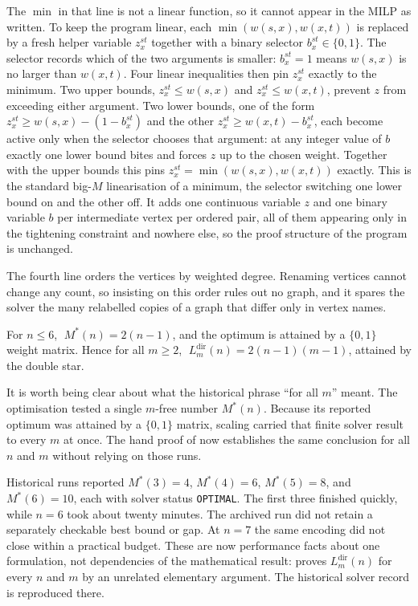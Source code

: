 The $\min$ in that line is not a linear function, so it cannot appear in the MILP as written. To keep the program linear, each $\min(w(s,x), w(x,t))$ is replaced by a fresh helper variable $z^{st}_x$ together with a binary selector $b^{st}_x \in \{0,1\}$. The selector records which of the two arguments is smaller: $b^{st}_x = 1$ means $w(s,x)$ is no larger than $w(x,t)$. Four linear inequalities then pin $z^{st}_x$ exactly to the minimum. Two upper bounds, $z^{st}_x \le w(s,x)$ and $z^{st}_x \le w(x,t)$, prevent $z$ from exceeding either argument. Two lower bounds, one of the form $z^{st}_x \ge w(s,x) - (1 - b^{st}_x)$ and the other $z^{st}_x \ge w(x,t) - b^{st}_x$, each become active only when the selector chooses that argument: at any integer value of $b$ exactly one lower bound bites and forces $z$ up to the chosen weight. Together with the upper bounds this pins $z^{st}_x = \min(w(s,x), w(x,t))$ exactly. This is the standard big-$M$ linearisation of a minimum, the selector switching one lower bound on and the other off. It adds one continuous variable $z$ and one binary variable $b$ per intermediate vertex per ordered pair, all of them appearing only in the tightening constraint and nowhere else, so the proof structure of the program is unchanged.

The fourth line orders the vertices by weighted degree. Renaming vertices cannot change any count, so insisting on this order rules out no graph, and it spares the solver the many relabelled copies of a graph that differ only in vertex names.

\begin{theorem}\label{thm:dir-multi-small}
For $n \le 6$, $\;M^{*}(n) = 2(n-1)$, and the optimum is attained by a $\{0,1\}$ weight matrix. Hence for all $m \ge 2$, $\;L_m^{\mathrm{dir}}(n) = 2(n - 1)(m - 1)$, attained by the double star.
\end{theorem}

It is worth being clear about what the historical phrase ``for all $m$'' meant. The optimisation tested a single $m$-free number $M^{*}(n)$. Because its reported optimum was attained by a $\{0,1\}$ matrix, scaling carried that finite solver result to every $m$ at once. The hand proof of  now establishes the same conclusion for all $n$ and $m$ without relying on those runs.

Historical runs reported $M^{*}(3)=4$, $M^{*}(4)=6$, $M^{*}(5)=8$, and $M^{*}(6)=10$, each with solver status \texttt{OPTIMAL}. The first three finished quickly, while $n=6$ took about twenty minutes. The archived run did not retain a separately checkable best bound or gap. At $n=7$ the same encoding did not close within a practical budget. These are now performance facts about one formulation, not dependencies of the mathematical result:  proves $L_m^{\mathrm{dir}}(n)$ for every $n$ and $m$ by an unrelated elementary argument. The historical solver record is reproduced there.

